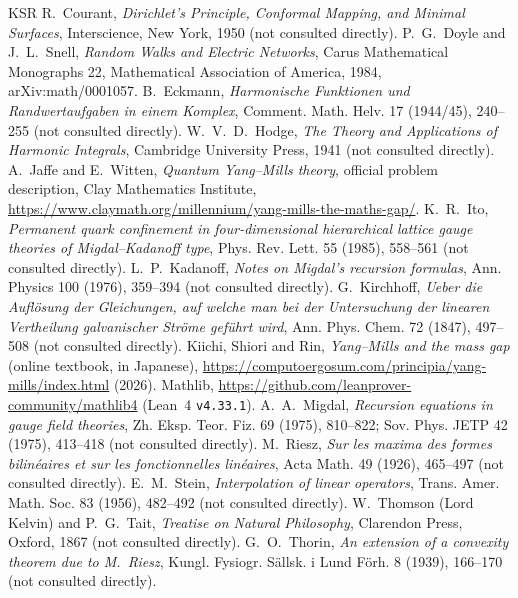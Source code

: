 \documentclass[11pt,a4paper]{article}
\theoremstyle{definition}
\theoremstyle{remark}
\newcommand{\code}[1]{\texttt{#1}}
\begin{document}
\begin{thebibliography}{KSR}
 R.~Courant, \emph{Dirichlet's Principle, Conformal Mapping, and Minimal Surfaces}, Interscience, New York, 1950 (not consulted directly).
 P.~G.~Doyle and J.~L.~Snell, \emph{Random Walks and Electric Networks}, Carus Mathematical Monographs 22, Mathematical Association of America, 1984, arXiv:math/0001057.
 B.~Eckmann, \emph{Harmonische Funktionen und Randwertaufgaben in einem Komplex}, Comment. Math. Helv. 17 (1944/45), 240--255 (not consulted directly).
 W.~V.~D.~Hodge, \emph{The Theory and Applications of Harmonic Integrals}, Cambridge University Press, 1941 (not consulted directly).
 A.~Jaffe and E.~Witten, \emph{Quantum Yang--Mills theory}, official problem description, Clay Mathematics Institute, \url{https://www.claymath.org/millennium/yang-mills-the-maths-gap/}.
 K.~R.~Ito, \emph{Permanent quark confinement in four-dimensional hierarchical lattice gauge theories of Migdal--Kadanoff type}, Phys. Rev. Lett. 55 (1985), 558--561 (not consulted directly).
 L.~P.~Kadanoff, \emph{Notes on Migdal's recursion formulas}, Ann. Physics 100 (1976), 359--394 (not consulted directly).
 G.~Kirchhoff, \emph{Ueber die Aufl\"osung der Gleichungen, auf welche man bei der Untersuchung der linearen Vertheilung galvanischer Str\"ome gef\"uhrt wird}, Ann. Phys. Chem. 72 (1847), 497--508 (not consulted directly).
 Kiichi, Shiori and Rin, \emph{Yang--Mills and the mass gap} (online textbook, in Japanese), \url{https://computoergosum.com/principia/yang-mills/index.html} (2026).
 Mathlib, \url{https://github.com/leanprover-community/mathlib4} (Lean~4 \code{v4.33.1}).
 A.~A.~Migdal, \emph{Recursion equations in gauge field theories}, Zh. Eksp. Teor. Fiz. 69 (1975), 810--822; Sov. Phys. JETP 42 (1975), 413--418 (not consulted directly).
 M.~Riesz, \emph{Sur les maxima des formes bilin\'eaires et sur les fonctionnelles lin\'eaires}, Acta Math. 49 (1926), 465--497 (not consulted directly).
 E.~M.~Stein, \emph{Interpolation of linear operators}, Trans. Amer. Math. Soc. 83 (1956), 482--492 (not consulted directly).
 W.~Thomson (Lord Kelvin) and P.~G.~Tait, \emph{Treatise on Natural Philosophy}, Clarendon Press, Oxford, 1867 (not consulted directly).
 G.~O.~Thorin, \emph{An extension of a convexity theorem due to M.~Riesz}, Kungl. Fysiogr. S\"allsk. i Lund F\"orh. 8 (1939), 166--170 (not consulted directly).
\end{thebibliography}
\end{document}
